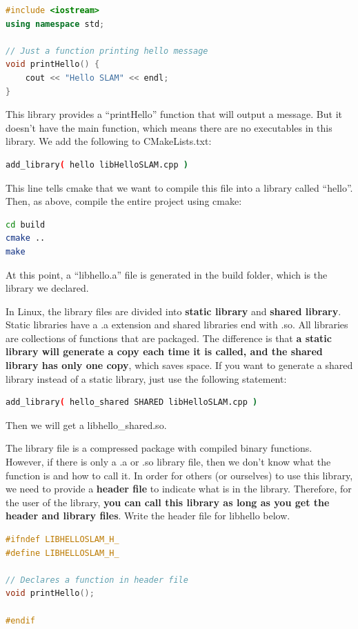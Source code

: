 \begin{lstlisting}[language=c++,caption=slambook2/ch2/libHelloSLAM.cpp]
#include <iostream>
using namespace std;

// Just a function printing hello message
void printHello() {
    cout << "Hello SLAM" << endl;
}
\end{lstlisting}
This library provides a ``printHello'' function that will output a message. But it doesn't have the main function, which means there are no executables in this library. We add the following to CMakeLists.txt:
\begin{lstlisting}[language=sh,caption=slambook2/ch2/CMakeLists.txt]
add_library( hello libHelloSLAM.cpp )
\end{lstlisting}
This line tells cmake that we want to compile this file into a library called ``hello''. Then, as above, compile the entire project using cmake:
\begin{lstlisting}[language=sh,caption=Terminal input]
cd build
cmake ..
make
\end{lstlisting}
At this point, a ``libhello.a'' file is generated in the build folder, which is the library we declared.

In Linux, the library files are divided into \textbf{static library} and \textbf{shared library}. Static libraries have a .a extension and shared libraries end with .so. All libraries are collections of functions that are packaged. The difference is that \textbf{a static library will generate a copy each time it is called, and the shared library has only one copy}, which saves space. If you want to generate a shared library instead of a static library, just use the following statement:

\begin{lstlisting}[language=sh,caption=slambook2/ch2/CMakeLists.txt]
add_library( hello_shared SHARED libHelloSLAM.cpp )
\end{lstlisting}
Then we will get a libhello\_shared.so.

The library file is a compressed package with compiled binary functions. However, if there is only a .a or .so library file, then we don't know what the function is and how to call it. In order for others (or ourselves) to use this library, we need to provide a \textbf{header file} to indicate what is in the library. Therefore, for the user of the library, \textbf{you can call this library as long as you get the header and library files}. Write the header file for libhello below.

\begin{lstlisting}[language=c++,caption=slambook2/ch2/libHelloSLAM.h]
#ifndef LIBHELLOSLAM_H_
#define LIBHELLOSLAM_H_

// Declares a function in header file
void printHello();

#endif
\end{lstlisting}

